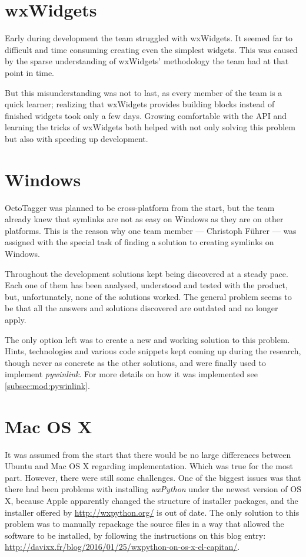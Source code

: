 \section{wxWidgets}

Early during development the team struggled with wxWidgets. It seemed far to
difficult and time consuming creating even the simplest widgets. This was
caused by the sparse understanding of wxWidgets' methodology the team had at
that point in time.

But this misunderstanding was not to last, as every member of the team is a
quick learner; realizing that wxWidgets provides building blocks instead of
finished widgets took only a few days. Growing comfortable with the API and
learning the tricks of wxWidgets both helped with not only solving this problem
but also with speeding up development.

\section{Windows}

OctoTagger was planned to be cross-platform from the start, but the team
already knew that symlinks are not as easy on Windows as they are on other
platforms. This is the reason why one team member --- Christoph Führer --- was
assigned with the special task of finding a solution to creating symlinks on
Windows.

Throughout the development solutions kept being discovered at a steady pace.
Each one of them has been analysed, understood and tested with the product,
but, unfortunately, none of the solutions worked. The general problem seems to
be that all the answers and solutions discovered are outdated and no longer
apply.

The only option left was to create a new and working solution to this problem.
Hints, technologies and various code snippets kept coming up during the
research, though never as concrete as the other solutions, and were finally
used to implement \emph{pywinlink}. For more details on how it was implemented
see \cref{subsec:mod:pywinlink}.

\section{Mac OS X}

It was assumed from the start that there would be no large differences between
Ubuntu and Mac OS X regarding implementation. Which was true for the most part.
However, there were still some challenges. One of the biggest issues was
that there had been problems with installing \emph{wxPython}  under the newest 
version of OS X, because Apple apparently changed the structure of installer packages,
and the installer offered by \url{http://wxpython.org/} is out of date. The only solution to this problem was to manually repackage the source files in a way that allowed the software to be installed, by following the instructions on this blog entry: \url{http://davixx.fr/blog/2016/01/25/wxpython-on-os-x-el-capitan/}.

